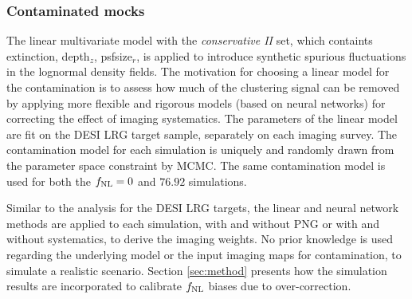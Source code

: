 \subsubsection{Contaminated mocks}
The linear multivariate model with the \textit{conservative II} set, which containts extinction, depth$_{z}$, psfsize$_{r}$, is applied to introduce synthetic spurious fluctuations in the lognormal density fields. The motivation for choosing a linear model for the contamination is to assess how much of the clustering signal can be removed by applying more flexible and rigorous models (based on neural networks) for correcting the effect of imaging systematics. The parameters of the linear model are fit on the DESI LRG target sample, separately on each imaging survey. The contamination model for each simulation is uniquely and randomly drawn from the parameter space constraint by MCMC. The same contamination model is used for both the $f_{\rm NL}=0$ and $76.92$ simulations.

Similar to the analysis for the DESI LRG targets, the linear and neural network methods are applied to each simulation, with and without PNG or with and without systematics, to derive the imaging weights. No prior knowledge is used regarding the underlying model or the input imaging maps for contamination, to simulate a realistic scenario. Section \ref{sec:method} presents how the simulation results are incorporated to calibrate $f_{\rm NL}$ biases due to over-correction. 